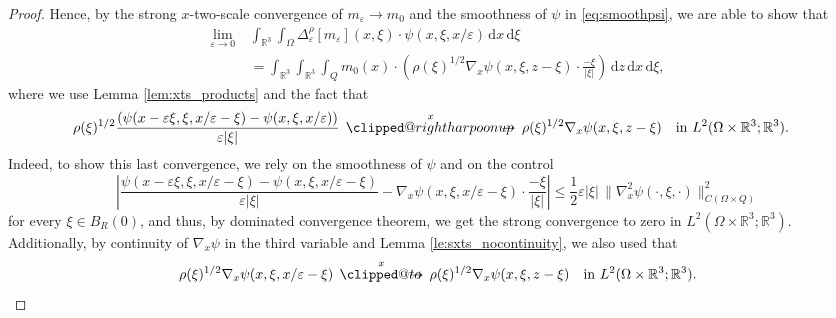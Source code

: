 \documentclass[reqno,11pt]{amsart}
\makeatletter
\numberwithin{equation}{section}
\theoremstyle{thmlemcorr}
\numberwithin{theorem}{section}
\theoremstyle{thmlemcorr*}
\theoremstyle{defi}
\theoremstyle{remexample}
\theoremstyle{ass}
\newcommand{\R}{\mathbb{R}}
\renewcommand{\epsilon}{\varepsilon}
\newcommand{\dd}{\,\mathrm{d}}
\newcommand{\1}{\mathds{1}}
\DeclareRobustCommand{\wtwoscale}{%
  \clippedrightharpoonup\mathrel{\mspace{-15mu}}\rightharpoonup
}
\newcommand{\clippedrightharpoonup}{%
  \mathrel{\mathpalette\clipped@rightharpoonup\relax}%
}
\newcommand{\clipped@rightharpoonup}[2]{%
  \sbox\z@{$\m@th#1\mspace{6mu}$}%
  \clipbox{0pt 0pt {\dimexpr\width-.5\wd\z@} 0pt}{$\m@th#1\rightharpoonup$}%
  \smash{\clipbox{{\wd\z@} 0pt 0pt {-\width}}{$\m@th#1\rightharpoonup$}}%
}
\DeclareRobustCommand{\twoscale}{%
  \clippedto\mathrel{\mspace{-15mu}}\to
}
\newcommand{\clippedto}{%
  \mathrel{\mathpalette\clipped@to\relax}%
}
\newcommand{\clipped@to}[2]{%
  \sbox\z@{$\m@th#1\mspace{6mu}$}%
  \clipbox{0pt 0pt {\dimexpr\width-.5\wd\z@} 0pt}{$\m@th#1\to$}%
  \smash{\clipbox{{\wd\z@} 0pt 0pt {-\width}}{$\m@th#1\to$}}%
}
\newcommand{\xtwoscale}{\overset{x}{\twoscale}}
\newcommand{\wxtwoscale}{\overset{x}{\wtwoscale}}
\newcommand{\Om}{\Omega}
\newcommand{\veps}{\varepsilon}
\makeatother
\begin{document}
\begin{proof}
    Hence, by the strong $x$-two-scale convergence of $m_\epsilon \to m_0$ and the smoothness of $\psi$ in \eqref{eq:smoothpsi}, we are able to show that 
    \begin{equation}\label{1 - limit}
        \begin{split}
    \lim_{\epsilon \to 0} &\int_{\R^3}\int_{\Omega} \Delta_\epsilon^\rho[m_\veps](x,\xi) \cdot \psi(x,\xi,x/\epsilon)\dd x\dd \xi \\
    \qquad &= \int_{\R^3}\int_{\R^3}\int_{Q}m_0(x) \cdot\left(\rho(\xi)^{1/2}\nabla_x \psi(x,\xi,z-\xi)\cdot\frac{-\xi}{|\xi|}\right)\dd z\dd x\dd \xi, 
    \end{split}
    \end{equation}
    where we use %
    Lemma \ref{lem:xts_products} and the fact that \begin{equation*}
        \rho(\xi)^{1/2}\frac{(\psi(x-\epsilon\xi,\xi,x/\epsilon-\xi)-\psi(x,\xi,x/\epsilon))}{\epsilon|\xi|} \, \wxtwoscale \,\rho(\xi)^{1/2}\nabla_x \psi(x,\xi,z-\xi) \quad \text{in } L^2(\Omega \times \R^3; \R^3). \quad %
    \end{equation*} Indeed, to show this last convergence, we rely on the smoothness of $\psi$ and on the control 
    \begin{equation*}
        \left| \frac{\psi(x-\epsilon\xi,\xi,x/\epsilon-\xi)-\psi(x,\xi,x/\epsilon-\xi)}{\veps|\xi|} - \nabla_x \psi(x,\xi,x/\epsilon-\xi)\cdot\frac{-\xi}{|\xi|} \right| \leq \frac{1}{2} \veps |\xi| \, \|\nabla_x^2 \psi(\cdot,\xi,\cdot)\|^2_{C(\Omega\times Q)}
    \end{equation*} for every $\xi \in B_R(0)$, and thus, by dominated convergence theorem, we get the strong convergence to zero in $L^2(\Omega \times \R^3; \R^3).$ Additionally, by continuity of $\nabla_x \psi$ in the third variable and Lemma \ref{le:sxts_nocontinuity}, we also used that 
    \begin{equation*}
        \rho(\xi)^{1/2}\nabla_x \psi(x,\xi,x/\epsilon-\xi) \, \xtwoscale \, \rho(\xi)^{1/2}\nabla_x \psi(x,\xi,z-\xi) \quad \text{in } L^2(\Om \times \R^3; \R^3).
    \end{equation*}


\end{proof}
\end{document}
